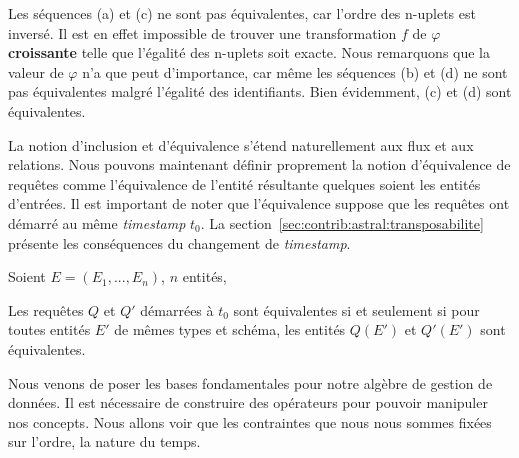 \begin{example}
Les séquences (a) et (c) ne sont pas équivalentes, car l'ordre des n-uplets est inversé. Il est en effet impossible de trouver une transformation $f$ de $\varphi$ \textbf{croissante} telle que l'égalité des n-uplets soit exacte. Nous remarquons que la valeur de $\varphi$ n'a que peut d'importance, car même les séquences (b) et (d) ne sont pas équivalentes malgré l'égalité des identifiants. Bien évidemment, (c) et (d) sont équivalentes.
\end{example}

La notion d'inclusion et d'équivalence s'étend naturellement aux flux et aux relations. Nous pouvons maintenant définir proprement la notion d'équivalence de requêtes comme l'équivalence de l'entité résultante quelques soient les entités d'entrées. Il est important de noter que l'équivalence suppose que les requêtes ont démarré au même \textit{timestamp} $t_0$. La section~\ref{sec:contrib:astral:transposabilite} présente les conséquences du changement de \textit{timestamp}.
\begin{defi}\label{def:equivalence}
	Soient $E=(E_1, ..., E_n)$, $n$ entités,
	
	Les requêtes $Q$ et $Q'$ démarrées à $t_0$ sont équivalentes si et seulement si pour toutes entités $E'$ de mêmes types et schéma, les entités $Q(E')$ et $Q'(E')$ sont équivalentes.
\end{defi}

Nous venons de poser les bases fondamentales pour notre algèbre de gestion de données. Il est nécessaire de construire des opérateurs pour pouvoir manipuler nos concepts. Nous allons voir que les contraintes que nous nous sommes fixées sur l'ordre, la nature du temps.
